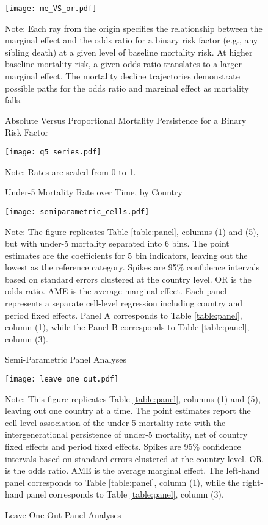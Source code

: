 \documentclass[12pt,english]{article}
\begin{document}
\begin{figure}
    \caption{Absolute Versus Proportional Mortality Persistence for a Binary Risk Factor}
    \label{figure:meVSor}
    \begin{center}
    \texttt{[image: me\_VS\_or.pdf]}
    \end{center}
\footnotesize{Note: Each ray from the origin specifies the relationship between the marginal effect and the odds ratio for a binary risk factor (e.g., any sibling death) at a given level of baseline mortality risk. At higher baseline mortality risk, a given odds ratio translates to a larger marginal effect. The mortality decline trajectories demonstrate possible paths for the odds ratio and marginal effect as mortality falls.}
\end{figure}

\begin{sidewaysfigure}
    \caption{Under-5 Mortality Rate over Time, by Country}
    \label{figure:u5series}
    \begin{center}    
    \texttt{[image: q5\_series.pdf]}
    \end{center}
Note: Rates are scaled from 0 to 1.
\end{sidewaysfigure}

\begin{figure}
    \caption{Semi-Parametric Panel Analyses}
    \label{figure:semiparm}
    \begin{center}
    \texttt{[image: semiparametric\_cells.pdf]}
    \end{center}
\footnotesize{Note: The figure replicates Table \ref{table:panel}, columns (1) and (5), but with under-5 mortality separated into 6 bins. The point estimates are the coefficients for 5 bin indicators, leaving out the lowest as the reference category. Spikes are 95\% confidence intervals based on standard errors clustered at the country level. OR is the odds ratio. AME is the average marginal effect. Each panel represents a separate cell-level regression including country and period fixed effects. Panel A corresponds to Table \ref{table:panel}, column (1), while the Panel B corresponds to Table \ref{table:panel}, column (3).}
\end{figure}

\begin{figure}
    \caption{Leave-One-Out Panel Analyses}
    \label{figure:leaveout}
    \texttt{[image: leave\_one\_out.pdf]}

\footnotesize{Note: This figure replicates Table \ref{table:panel}, columns (1) and (5), leaving out one country at a time. The point estimates report the cell-level association of the under-5 mortality rate with the intergenerational persistence of under-5 mortality, net of country fixed effects and period fixed effects. Spikes are 95\% confidence intervals based on standard errors clustered at the country level. OR is the odds ratio. AME is the average marginal effect. The left-hand panel corresponds to Table \ref{table:panel}, column (1), while the right-hand panel corresponds to Table \ref{table:panel}, column (3).}
\end{figure}
\end{document}

